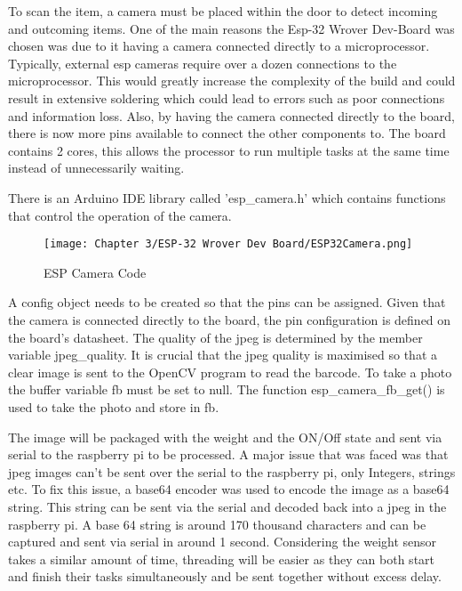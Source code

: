 To scan the item, a camera must be placed within the door to detect incoming and outcoming items.
One of the main reasons the Esp-32 Wrover Dev-Board was chosen was due to it having a camera connected directly to a microprocessor.
Typically, external esp cameras require over a dozen connections to the microprocessor.
This would greatly increase the complexity of the build and could result in extensive soldering which could lead to errors such as poor connections and information loss.
Also, by having the camera connected directly to the board, there is now more pins available to connect the other components to.
The board contains 2 cores, this allows the processor to run multiple tasks at the same time instead of unnecessarily waiting.

There is an Arduino IDE library called 'esp\_camera.h' which contains functions that control the operation of the camera.

\begin{figure}[H]        
    \centering
    \texttt{[image: Chapter 3/ESP-32 Wrover Dev Board/ESP32Camera.png]}
    \caption{ESP Camera Code}
    \label{fig:espcamcode}
\end{figure} 

A config object needs to be created so that the pins can be assigned.
Given that the camera is connected directly to the board, the pin configuration is defined on the board's datasheet.
The quality of the jpeg is determined by the member variable jpeg\_quality.
It is crucial that the jpeg quality is maximised so that a clear image is sent to the OpenCV program to read the barcode.
To take a photo the buffer variable fb must be set to null.
The function esp\_camera\_fb\_get() is used to take the photo and store in fb.

The image will be packaged with the weight and the ON/Off state and sent via serial to the raspberry pi to be processed.
A major issue that was faced was that jpeg images can't be sent over the serial to the raspberry pi, only Integers, strings etc.
To fix this issue, a base64 encoder was used to encode the image as a base64 string.
This string can be sent via the serial and decoded back into a jpeg in the raspberry pi.
A base 64 string is around 170 thousand characters and can be captured and sent via serial in around 1 second.
Considering the weight sensor takes a similar amount of time, threading will be easier as they can both start and finish their tasks simultaneously and be sent together without excess delay.

